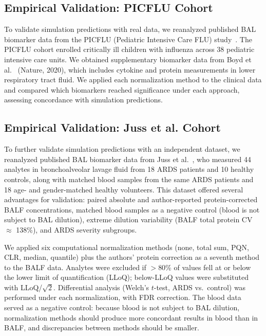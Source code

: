 \documentclass[12pt]{article}
\begin{document}
\subsection{Empirical Validation: PICFLU Cohort}

To validate simulation predictions with real data, we reanalyzed published BAL biomarker data from the PICFLU (Pediatric Intensive Care FLU) study~\cite{Boyd2020,Randolph2011}. The PICFLU cohort enrolled critically ill children with influenza across 38 pediatric intensive care units. We obtained supplementary biomarker data from Boyd et al.~\cite{Boyd2020} (Nature, 2020), which includes cytokine and protein measurements in lower respiratory tract fluid. We applied each normalization method to the clinical data and compared which biomarkers reached significance under each approach, assessing concordance with simulation predictions.

\subsection{Empirical Validation: Juss et al. Cohort}

To further validate simulation predictions with an independent dataset, we reanalyzed published BAL biomarker data from Juss et al.~\cite{Juss2016}, who measured 44 analytes in bronchoalveolar lavage fluid from 18 ARDS patients and 10 healthy controls, along with matched blood samples from the same ARDS patients and 18 age- and gender-matched healthy volunteers. This dataset offered several advantages for validation: paired absolute and author-reported protein-corrected BALF concentrations, matched blood samples as a negative control (blood is not subject to BAL dilution), extreme dilution variability (BALF total protein CV $\approx$ 138\%), and ARDS severity subgroups.

We applied six computational normalization methods (none, total sum, PQN, CLR, median, quantile) plus the authors' protein correction as a seventh method to the BALF data. Analytes were excluded if $>$80\% of values fell at or below the lower limit of quantification (LLoQ); below-LLoQ values were substituted with LLoQ/$\sqrt{2}$. Differential analysis (Welch's $t$-test, ARDS vs.\ control) was performed under each normalization, with FDR correction. The blood data served as a negative control: because blood is not subject to BAL dilution, normalization methods should produce more concordant results in blood than in BALF, and discrepancies between methods should be smaller.
\end{document}
